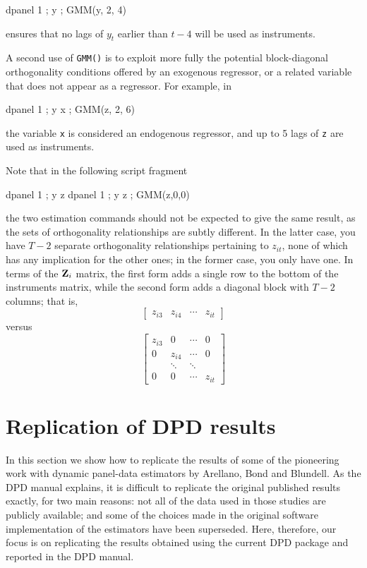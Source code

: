 \begin{code}
  dpanel 1 ; y ; GMM(y, 2, 4)
\end{code}
ensures that no lags of $y_t$ earlier than $t-4$ will be used as
instruments.

A second use of \texttt{GMM()} is to exploit more fully the potential
block-diagonal orthogonality conditions offered by an exogenous
regressor, or a related variable that does not appear as a regressor.
For example, in

\begin{code}
  dpanel 1 ; y x ; GMM(z, 2, 6)
\end{code}
the variable \texttt{x} is considered an endogenous regressor, and up to
5 lags of \texttt{z} are used as instruments.

Note that in the following script fragment
\begin{code}
  dpanel 1 ; y z
  dpanel 1 ; y z ; GMM(z,0,0)
\end{code}
the two estimation commands should not be expected to give the same
result, as the sets of orthogonality relationships are subtly
different.  In the latter case, you have $T-2$ separate orthogonality
relationships pertaining to $z_{it}$, none of which has any
implication for the other ones; in the former case, you only have one.
In terms of the $\mathbf{Z}_i$ matrix, the first form adds a single row to
the bottom of the instruments matrix, while the second form adds a
diagonal block with $T-2$ columns; that is,
\[
  \left[ \begin{array}{cccc}
         z_{i3} & z_{i4} & \cdots & z_{it}
       \end{array} \right]
\] 
versus
\[
  \left[ \begin{array}{cccc}
         z_{i3} & 0 & \cdots & 0 \\
         0 & z_{i4} & \cdots & 0 \\
          & \ddots & \ddots &  \\
         0 & 0 & \cdots & z_{it} 
       \end{array} \right]
\]

\section{Replication of DPD results}
\label{sec:DPD-replic}

In this section we show how to replicate the results of some of the
pioneering work with dynamic panel-data estimators by Arellano, Bond
and Blundell.  As the DPD manual \citep*{DPDmanual} explains, it is
difficult to replicate the original published results exactly, for two
main reasons: not all of the data used in those studies are publicly
available; and some of the choices made in the original software
implementation of the estimators have been superseded.  Here,
therefore, our focus is on replicating the results obtained using the
current DPD package and reported in the DPD manual.

